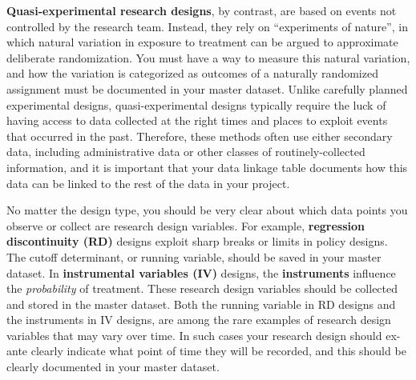 
\textbf{Quasi-experimental research designs},
by contrast, are based on events not controlled by the research team.
Instead, they rely on ``experiments of nature'',
in which natural variation in exposure to treatment
can be argued to approximate deliberate randomization.
You must have a way to measure this natural variation,
and how the variation is categorized as outcomes of a naturally randomized assignment
must be documented in your master dataset.
Unlike carefully planned experimental designs,
quasi-experimental designs typically require the luck
of having access to data collected at the right times and places
to exploit events that occurred in the past.
Therefore, these methods often use either secondary data,
including administrative data or other classes of routinely-collected information,
and it is important that your data linkage table documents
how this data can be linked to the rest of the data in your project.


No matter the design type, you should be very clear about
which data points you observe or collect are research design variables.
For example,
\textbf{regression discontinuity (RD)}
designs exploit sharp breaks or limits
in policy designs.
The cutoff determinant, or running variable,
should be saved in your master dataset.
In \textbf{instrumental variables (IV)}
designs, the \textbf{instruments} influence the \textit{probability} of treatment.
These research design variables should be collected
and stored in the master dataset.
Both the running variable in RD designs
and the instruments in IV designs,
are among the rare examples of research design variables
that may vary over time.
In such cases your research design should
ex-ante clearly indicate what point of time they will be recorded,
and this should be clearly documented in your master dataset.


